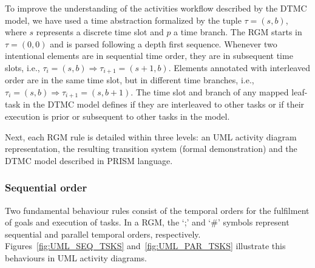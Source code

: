 To improve the understanding of the activities workflow described by the DTMC model, we have used a time abstraction formalized by the tuple $\tau = (s,b)$, where $s$ represents a discrete time slot and $p$ a time branch. The RGM starts in $\tau = (0,0)$ and is parsed following a depth first sequence. Whenever two intentional elements are in sequential time order, they are in subsequent time slots, i.e., $\tau_i = (s,b) \Rightarrow \tau_{i+1} = (s+1, b)$. Elements annotated with interleaved order are in the same time slot, but in different time branches, i.e., $\tau_i = (s,b) \Rightarrow \tau_{i+1} = (s, b+1)$. The time slot and branch of any mapped leaf-task in the DTMC model defines if they are interleaved to other tasks or if their execution is prior or subsequent to other tasks in the model.



Next, each RGM rule is detailed within three levels: an UML activity diagram representation, the resulting transition system (formal demonstration) and the DTMC model described in PRISM language.




\subsubsection{Sequential order}

Two fundamental behaviour rules consist of the temporal orders for the fulfilment of goals and execution of tasks. In a RGM, the `;' and `\#' symbols represent sequential and parallel temporal orders, respectively. Figures~\ref{fig:UML_SEQ_TSKS} and~\ref{fig:UML_PAR_TSKS} illustrate this behaviours in UML activity diagrams.

